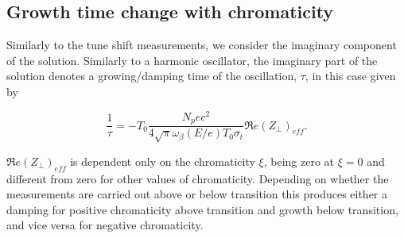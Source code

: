 \subsection{Growth time change with chromaticity}
\label{sec:growth-time-chrom}

Similarly to the tune shift measurements, we consider the imaginary component of the solution. Similarly to a harmonic oscillator, the imaginary part of the solution denotes a growing/damping time of the oscillation, $\tau$, in this case given by

\begin{equation}
\frac{1}{\tau} = -T_{0} \frac{N_{p}ec^{2}}{4\sqrt{\pi}\omega_{\beta} \left( E/e \right)T_{0}\sigma_{t}} \Re{}e\left(  Z_{\perp} \right)_{eff}.
\end{equation}

$\Re{}e\left(  Z_{\perp} \right)_{eff}$ is dependent only on the chromaticity $\xi$, being zero at $\xi = 0$ and different from zero for other values of chromaticity. Depending on whether the measurements are carried out above or below transition this produces either a damping for positive chromaticity above transition and growth below transition, and vice versa for negative chromaticity.
